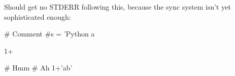 \documentclass[11pt]{article}
\begin{document}
Should get no STDERR following this, because the sync system isn't yet sophisticated enough:  \stderrpythontex

\begin{rubyblock}[err1]
# Comment
#s = 'Python a
\end{rubyblock}

\stderrpythontex


\begin{rubyblock}[err2][numbers=left]
1+
\end{rubyblock}

\stderrpythontex


\begin{rubyblock}[err3][numbers=left]
# Hmm
# Ah
1+'ab'
\end{rubyblock}

\stderrpythontex
\end{document}
